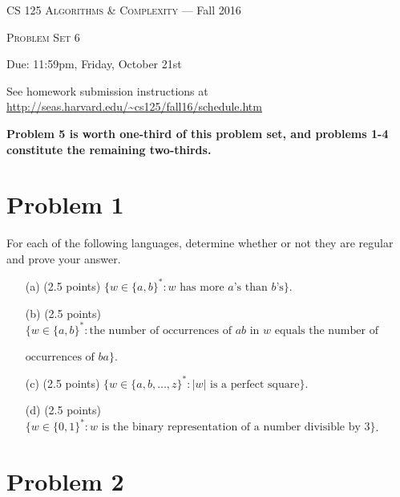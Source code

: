 \documentclass[12pt]{article}
\begin{document}
\thispagestyle{empty}

\begin{center}
{\Large \textsc{CS 125 Algorithms \& Complexity} --- Fall 2016}

\bigskip

{\Large \textsc{Problem Set 6}}

\smallskip

Due: 11:59pm, Friday, October 21st

\bigskip

{\footnotesize See homework submission instructions at \url{http://seas.harvard.edu/~cs125/fall16/schedule.htm}}
\end{center}

\textbf{Problem 5 is worth one-third of this problem set, and problems 1-4 constitute the remaining two-thirds.}

\bigskip

\section*{Problem 1} 

For each of the following languages, determine whether or not they are regular and prove your answer.
\begin{itemize}
\item[(a)] (2.5 points) $\{ w\in \{a,b\}^* : \mbox{$w$ has more $a$'s than $b$'s}\}$.
\item[(b)] (2.5 points) $\{ w\in \{a,b\}^* : \mbox{the number of occurrences of $ab$ in $w$ equals the number of}$
\item[] \hspace{1in}$\mbox{occurrences of $ba$}\}$.
\item[(c)] (2.5 points) $\{ w\in \{a,b,\ldots,z\}^* : \mbox{$|w|$ is a perfect square}\}$.
\item[(d)] (2.5 points)  $\{ w\in \{0,1\}^* : \mbox{$w$ is the binary representation of a number divisible by 3}\}$.
\end{itemize}

\section*{Problem 2}
\end{document}
